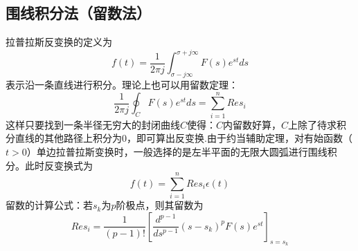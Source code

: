 \subsection{围线积分法（留数法）}
拉普拉斯反变换的定义为
\begin{equation}
    f(t)=\dfrac{1}{2\pi j}\int_{\sigma-j\infty}^{\sigma+j\infty}F(s)e^{st}ds 
\end{equation}
表示沿一条直线进行积分。理论上也可以用留数定理：
\begin{equation}
    \dfrac{1}{2\pi j}\oint_C F(s)e^{st}ds =\sum_{i=1}^{n}Res_i
\end{equation}
这样只要找到一条半径无穷大的封闭曲线$C$使得：$C$内留数好算，$C$上除了待求积分直线的其他路径上积分为0，即可算出反变换.由于约当辅助定理，对有始函数（$t>0$）单边拉普拉斯变换时，一般选择的是左半平面的无限大圆弧进行围线积分。此时反变换式为
\begin{equation}
    f(t)=\sum_{i=1}^{n}Res_i \epsilon(t)
\end{equation}
留数的计算公式：若$s_k$为$p$阶极点，则其留数为
\begin{equation}
    Res_i=\dfrac{1}{(p-1)!}\left[ \dfrac{d^{p-1}}{ds^{p-1}}(s-s_k)^p F(s)e^{st} \right]_{s=s_k}
\end{equation}
